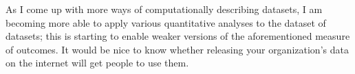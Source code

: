 \documentclass{acm_proc_article-sp}
\begin{document}
As I come up with more ways of computationally describing datasets, I am becoming
more able to apply various quantitative analyses to the dataset of datasets;
this is starting to enable weaker versions of the aforementioned measure of
outcomes. It would be nice to know whether releasing your organization's data on
the internet will get people to use them.



\balancecolumns
\end{document}
